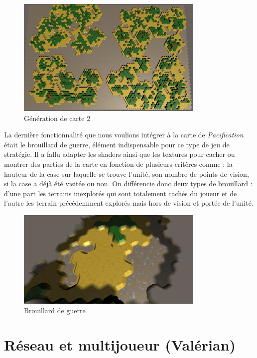 \documentclass[12pt]{report}
\begin{document}
\begin{figure}[H]
    \centering
    \includegraphics[width=0.8\textwidth]{MapGen2}
    \caption{Génération de carte 2}
\end{figure}

La dernière fonctionnalité que nous voulions intégrer à la carte de
\textit{Pacification} était le brouillard de guerre, élément indispensable pour
ce type de jeu de stratégie. Il a fallu adapter les shaders ainsi que les
textures pour cacher ou montrer des parties de la carte en fonction de
plusieurs critères comme : la hauteur de la case sur laquelle se trouve
l'unité, son nombre de points de vision, si la case a déjà été visitée ou non.
On différencie donc deux types de brouillard : d'une part les terrains
inexplorés qui sont totalement cachés du joueur et de l'autre les terrain
précédemment explorés mais hors de vision et portée de l'unité.

\begin{figure}[H]
    \centering
    \includegraphics[width=0.8\textwidth]{FogOfWar}
    \caption{Brouillard de guerre}
\end{figure}

\newpage

\section{Réseau et multijoueur (Valérian)}
\end{document}
